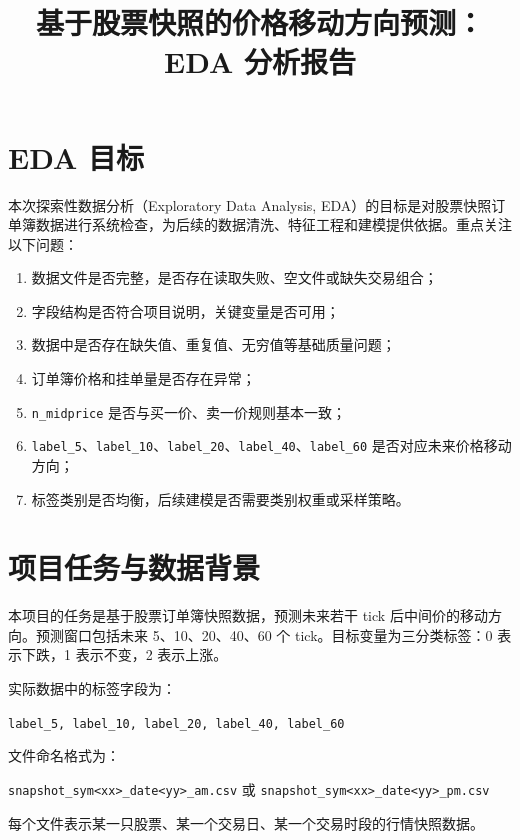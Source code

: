 \documentclass[UTF8,a4paper,12pt]{ctexart}
\title{基于股票快照的价格移动方向预测：EDA 分析报告}
\author{}
\date{}
\begin{document}
\maketitle

\section{EDA 目标}

本次探索性数据分析（Exploratory Data Analysis, EDA）的目标是对股票快照订单簿数据进行系统检查，为后续的数据清洗、特征工程和建模提供依据。重点关注以下问题：

\begin{enumerate}
    \item 数据文件是否完整，是否存在读取失败、空文件或缺失交易组合；
    \item 字段结构是否符合项目说明，关键变量是否可用；
    \item 数据中是否存在缺失值、重复值、无穷值等基础质量问题；
    \item 订单簿价格和挂单量是否存在异常；
    \item \texttt{n\_midprice} 是否与买一价、卖一价规则基本一致；
    \item \texttt{label\_5}、\texttt{label\_10}、\texttt{label\_20}、\texttt{label\_40}、\texttt{label\_60} 是否对应未来价格移动方向；
    \item 标签类别是否均衡，后续建模是否需要类别权重或采样策略。
\end{enumerate}

\section{项目任务与数据背景}

本项目的任务是基于股票订单簿快照数据，预测未来若干 tick 后中间价的移动方向。预测窗口包括未来 5、10、20、40、60 个 tick。目标变量为三分类标签：0 表示下跌，1 表示不变，2 表示上涨。

实际数据中的标签字段为：

\begin{center}
\texttt{label\_5, label\_10, label\_20, label\_40, label\_60}
\end{center}

文件命名格式为：

\begin{center}
\texttt{snapshot\_sym<xx>\_date<yy>\_am.csv} 或
\texttt{snapshot\_sym<xx>\_date<yy>\_pm.csv}
\end{center}

每个文件表示某一只股票、某一个交易日、某一个交易时段的行情快照数据。
\end{document}
